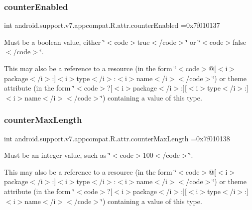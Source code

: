\subsubsection{\texorpdfstring{counter\+Enabled}{counterEnabled}}
{\footnotesize\ttfamily int android.\+support.\+v7.\+appcompat.\+R.\+attr.\+counter\+Enabled =0x7f010137\hspace{0.3cm}{\ttfamily [static]}}

Must be a boolean value, either \char`\"{}$<$code$>$true$<$/code$>$\char`\"{} or \char`\"{}$<$code$>$false$<$/code$>$\char`\"{}. 

This may also be a reference to a resource (in the form \char`\"{}$<$code$>$@\mbox{[}$<$i$>$package$<$/i$>$\+:\mbox{]}$<$i$>$type$<$/i$>$\+:$<$i$>$name$<$/i$>$$<$/code$>$\char`\"{}) or theme attribute (in the form \char`\"{}$<$code$>$?\mbox{[}$<$i$>$package$<$/i$>$\+:\mbox{]}\mbox{[}$<$i$>$type$<$/i$>$\+:\mbox{]}$<$i$>$name$<$/i$>$$<$/code$>$\char`\"{}) containing a value of this type. \mbox{\label{classandroid_1_1support_1_1v7_1_1appcompat_1_1R_1_1attr_a3ac08d5d35fcfeb3c8d8166422cce804}} 
\subsubsection{\texorpdfstring{counter\+Max\+Length}{counterMaxLength}}
{\footnotesize\ttfamily int android.\+support.\+v7.\+appcompat.\+R.\+attr.\+counter\+Max\+Length =0x7f010138\hspace{0.3cm}{\ttfamily [static]}}

Must be an integer value, such as \char`\"{}$<$code$>$100$<$/code$>$\char`\"{}. 

This may also be a reference to a resource (in the form \char`\"{}$<$code$>$@\mbox{[}$<$i$>$package$<$/i$>$\+:\mbox{]}$<$i$>$type$<$/i$>$\+:$<$i$>$name$<$/i$>$$<$/code$>$\char`\"{}) or theme attribute (in the form \char`\"{}$<$code$>$?\mbox{[}$<$i$>$package$<$/i$>$\+:\mbox{]}\mbox{[}$<$i$>$type$<$/i$>$\+:\mbox{]}$<$i$>$name$<$/i$>$$<$/code$>$\char`\"{}) containing a value of this type. \mbox{\label{classandroid_1_1support_1_1v7_1_1appcompat_1_1R_1_1attr_a413f70c3f970308cb81b4d96766b3a20}} 
